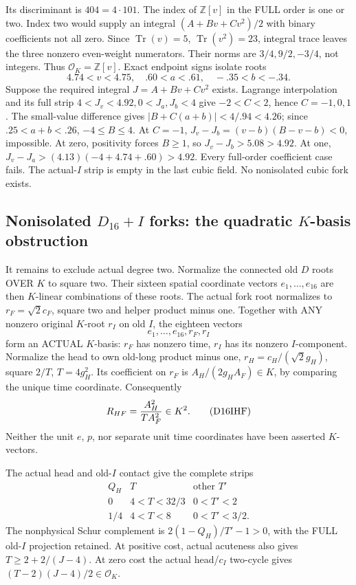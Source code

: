 Its discriminant is \(404=4\cdot101\).
The index of \(\mathbb Z[v]\) in
the FULL order is one or two.
Index two would supply an integral
\((A+Bv+Cv^2)/2\) with binary
coefficients not all zero.
Since \(\operatorname{Tr}(v)=5\),
\(\operatorname{Tr}(v^2)=23\),
integral trace leaves the three nonzero
even-weight numerators.
Their norms are \(3/4,9/2,-3/4\),
not integers.
Thus \(\mathcal O_K=\mathbb Z[v]\).
Exact endpoint signs isolate roots
\[
                        4.74<v<4.75,\quad .60<a<.61,\quad-.35<b<-.34 .
\]
Suppose the required integral
\(J=A+Bv+Cv^2\) exists.
Lagrange interpolation and its full
strip \(4<J_v<4.92,0<J_a,J_b<4\)
give \(-2<C<2\), hence \(C=-1,0,1\).
The small-value difference gives
\(|B+C(a+b)|<4/.94<4.26\);
since \(.25<a+b<.26\), \(-4\le B\le4\).
At \(C=-1\),
\(J_v-J_b=(v-b)(B-v-b)<0\), impossible.
At zero, positivity forces \(B\ge1\),
so \(J_v-J_b>5.08>4.92\).
At one,
\(J_v-J_a>(4.13)(-4+4.74+.60)>4.92\).
Every full-order coefficient case fails.
The actual-\(I\) strip is empty in the
last cubic field.
No nonisolated cubic fork exists.

\subsection{Nonisolated \(D_{16}+I\) forks: the quadratic \(K\)-basis obstruction}
\label{app:arithD16Inonisolatedquadratic}

It remains to exclude actual degree two.
Normalize the connected old \(D\) roots
OVER \(K\) to square two.
Their sixteen spatial coordinate vectors
\(e_1,\ldots,e_{16}\) are then
\(K\)-linear combinations of these roots.
The actual fork root normalizes to
\(r_F=\sqrt2c_F\), square two and
helper product minus one.
Together with ANY nonzero original
\(K\)-root \(r_I\) on old \(I\), the
eighteen vectors
\[
                          e_1,\ldots,e_{16},r_F,r_I
\]
form an ACTUAL \(K\)-basis:
\(r_F\) has nonzero time, \(r_I\)
has its nonzero \(I\)-component.
Normalize the head to own old-long
product minus one,
\(r_H=c_H/(\sqrt2g_H)\), square \(2/T\),
\(T=4g_H^2\).
Its coefficient on \(r_F\) is
\(A_H/(2g_HA_F)\in K\), by comparing
the unique time coordinate.
Consequently
\[
                         R_{HF}={A_H^2\over T A_F^2}\in K^2 .
\tag{D16IHF}\label{eq:arithD16Iheadforksquare}
\]
Neither the unit \(e\), \(p\), nor
separate unit time coordinates have
been asserted \(K\)-vectors.

The actual head and old-\(I\) contact
give the complete strips
\[
\begin{array}{c|c|c}
 Q_H&T&\text{other }T'\\ \hline
0&4<T<32/3&0<T'<2\\
1/4&4<T<8&0<T'<3/2 .
\end{array}
\]
The nonphysical Schur complement is
\(2(1-Q_H)/T'-1>0\), with the FULL
old-\(I\) projection retained.
At positive cost, actual acuteness
also gives \(T\ge2+2/(J-4)\).
At zero cost the actual head/\(c_I\)
two-cycle gives
\((T-2)(J-4)/2\in\mathcal O_K\).

